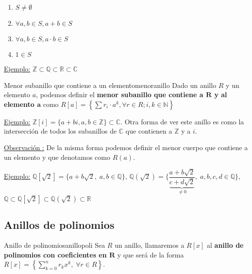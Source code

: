 \documentclass[10pt, a4paper]{article}
\newcommand{\R}{\mathbb{R}}
\newcommand{\N}{\mathbb{N}}
\newcommand{\Z}{\mathbb{Z}}
\newcommand{\C}{\mathbb{C}}
\newcommand{\Q}{\mathbb{Q}}
\newcommand{\obs}[1][\!\!]{ \underline{Observación #1:} }
\newcommand{\ej}{\underline{Ejemplo:} }
\begin{document}
\begin{enumerate}[label=\arabic*)]
	\item $S \neq \emptyset$
	\item $\forall a, b \in S, a + b \in S$
	\item $\forall a, b \in S, a \cdot b \in S$
	\item $1 \in S$
\end{enumerate}

\vspace{3mm}

\ej $\Z \subset \Q \subset \R \subset \C$

\begin{definition}{Menor subanillo que contiene a un elemento}{menoranillo}
Dado un anillo $R$ y un elemento $a$, podemos definir el \textbf{menor subanillo que contiene a $\mathbf{R}$ y al elemento $\mathbf{a}$} como $R[a] = \left \{ \displaystyle\sum r_i \cdot a^k, \forall r \in R; i, k \in \N \right \}$
\end{definition}

\ej $\Z[i] = \{a + bi, a, b \in \Z\} \subset \C$. Otra forma de ver este anillo es como la intersección de todos los subanillos de $\C$ que contienen a $\Z$ y a $i$.

\vspace{3mm}

\obs De la misma forma podemos definir el menor cuerpo que contiene a un elemento y que denotamos como $R(a)$.

\vspace{3mm}

\ej $\Q[\sqrt{2}] = \{a + b\sqrt{2}, \; a, b \in \Q\}$, $\Q(\sqrt{2}) = \bigg \{ \dfrac{a + b\sqrt{2}}{\underbrace{c + d\sqrt{2}}_{\neq 0}}, \; a, b, c, d \in \Q \bigg \}$, $\Q \subset \Q[\sqrt{2}] \subset \Q(\sqrt{2}) \subset \R$

\subsection{Anillos de polinomios}

\vspace{3mm}

\begin{definition}{Anillo de polinomios}{anillopoli}
Sea $R$ un anillo, llamaremos a $R[x]$ al \textbf{anillo de polinomios con coeficientes en $\mathbf{R}$} y que será de la forma $R[x] = \left \{ \displaystyle\sum_{k = 0}^{n} r_k x^k, \; \forall r \in R \right \}$.
\end{definition}
\end{document}
